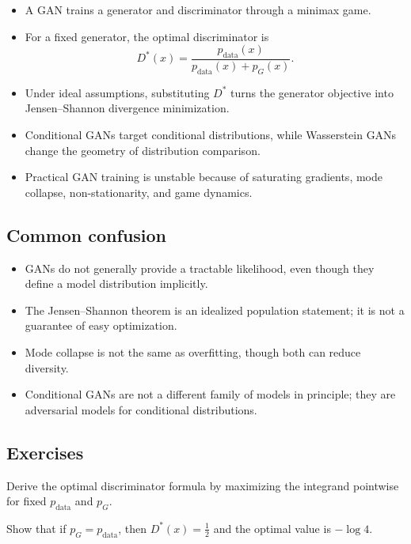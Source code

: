 \begin{itemize}
    \item A GAN trains a generator and discriminator through a minimax game.
    \item For a fixed generator, the optimal discriminator is
    \[
    D^*(x)=\frac{p_{\mathrm{data}}(x)}{p_{\mathrm{data}}(x)+p_G(x)}.
    \]
    \item Under ideal assumptions, substituting $D^*$ turns the generator objective into Jensen--Shannon divergence minimization.
    \item Conditional GANs target conditional distributions, while Wasserstein GANs change the geometry of distribution comparison.
    \item Practical GAN training is unstable because of saturating gradients, mode collapse, non-stationarity, and game dynamics.
\end{itemize}

\subsection*{Common confusion}

\begin{itemize}
    \item GANs do not generally provide a tractable likelihood, even though they define a model distribution implicitly.
    \item The Jensen--Shannon theorem is an idealized population statement; it is not a guarantee of easy optimization.
    \item Mode collapse is not the same as overfitting, though both can reduce diversity.
    \item Conditional GANs are not a different family of models in principle; they are adversarial models for conditional distributions.
\end{itemize}

\subsection*{Exercises}

\begin{exercise}
Derive the optimal discriminator formula by maximizing the integrand pointwise for fixed $p_{\mathrm{data}}$ and $p_G$.
\end{exercise}

\begin{exercise}
Show that if $p_G=p_{\mathrm{data}}$, then $D^*(x)=\tfrac12$ and the optimal value is $-\log 4$.
\end{exercise}

